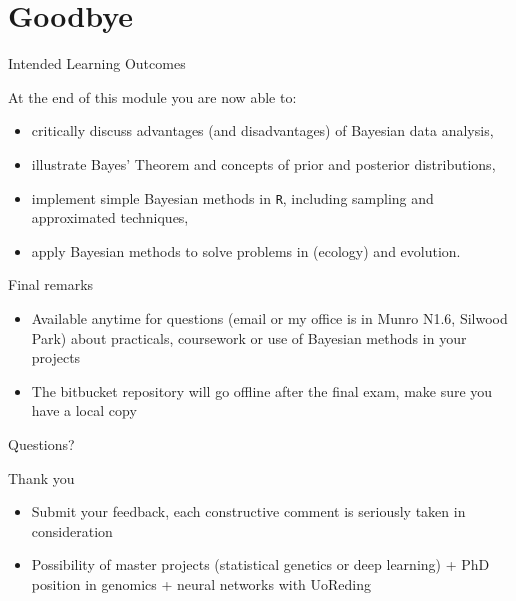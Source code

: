 
\section*{Goodbye}

\begin{frame}{Intended Learning Outcomes}

        At the end of this module you are now able to:
        \begin{itemize}
                \item critically discuss advantages (and disadvantages) of Bayesian data analysis,
                \item illustrate Bayes' Theorem and concepts of prior and posterior distributions,
                \item implement simple Bayesian methods in \texttt{R}, including sampling and approximated techniques,
                \item apply Bayesian methods to solve problems in (ecology) and evolution.
        \end{itemize}

\end{frame}

\begin{frame}{Final remarks}

	\begin{itemize}
		\item Available anytime for questions (email or my office is in Munro N1.6, Silwood Park) about
		practicals, coursework or use of Bayesian methods in your projects
		\item The bitbucket repository will go offline after the final exam, make sure you have a local copy
	\end{itemize}

	Questions?

\end{frame}

\begin{frame}{Thank you}

	\begin{itemize}
                \item Submit your feedback, each constructive comment is seriously taken in
		consideration
		\item Possibility of master projects (statistical genetics or deep learning) + PhD position in genomics + neural networks with UoReding
        \end{itemize}

\end{frame}















